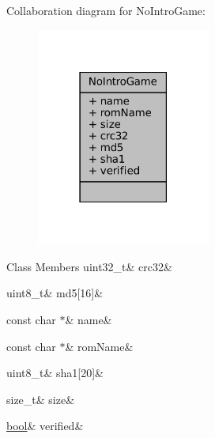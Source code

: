 Collaboration diagram for No\+Intro\+Game\+:
\nopagebreak
\begin{figure}[H]
\begin{center}
\leavevmode
\includegraphics[width=162pt]{struct_no_intro_game__coll__graph}
\end{center}
\end{figure}
\begin{DoxyFields}{Class Members}
\mbox{\label{no-intro_8h_a9d877941cb7e86e0c5028af5c501ecdc}} 
uint32\_t&
crc32&
\\
\hline

\mbox{\label{no-intro_8h_a8946ea9799cb2b1356b90ab544ed1bd2}} 
uint8\_t&
md5\mbox{[}16\mbox{]}&
\\
\hline

\mbox{\label{no-intro_8h_a1f00463418ccdbd1eed596c09df7835d}} 
const char $\ast$&
name&
\\
\hline

\mbox{\label{no-intro_8h_a0ba13974f1ee1c0835c43013dd38a795}} 
const char $\ast$&
romName&
\\
\hline

\mbox{\label{no-intro_8h_a58235ac62c8aaa365d3f84c2ea69f87c}} 
uint8\_t&
sha1\mbox{[}20\mbox{]}&
\\
\hline

\mbox{\label{no-intro_8h_ab4dba559a513fd1bd66a50cb248bc509}} 
size\_t&
size&
\\
\hline

\mbox{\label{no-intro_8h_a0f3788e6181926e929e497f99dbb0939}} 
\mbox{\hyperlink{libretro_8h_a4a26dcae73fb7e1528214a068aca317e}{bool}}&
verified&
\\
\hline

\end{DoxyFields}


